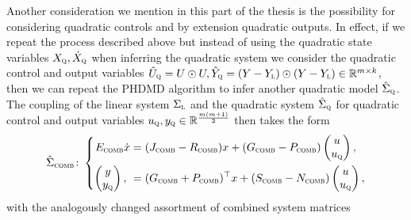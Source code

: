 
Another consideration we mention in this part of the thesis is the possibility for considering quadratic controls and by extension quadratic outputs.
In effect, if we repeat the process described above but instead of using the quadratic state variables $X_{\textnormal{\scshape q}}, \dot{X}_{\textnormal{\scshape q}}$ when inferring the quadratic system we consider the quadratic control and output variables $\hat{U}_{\textnormal{\scshape q}} = U \odot U, \hat{Y}_{\textnormal{\scshape q}} = (Y - Y_{\textnormal{\scshape l}}) \odot (Y - Y_{\textnormal{\scshape l}}) \in \mathbb{R}^{m \times k}$, then we can repeat the \ac{PHDMD} algorithm to infer another quadratic model $\hat{\Sigma}_{\textnormal{\scshape q}}$.
The coupling of the linear system $\Sigma_{\textnormal{\scshape l}}$ and the quadratic system $\hat{\Sigma}_{\textnormal{\scshape q}}$ for quadratic control and output variables $u_{\textnormal{\scshape q}}, y_{\textnormal{\scshape q}} \in \mathbb{R}^{\frac{m (m + 1)}{2}}$ then takes the form
\begin{equation}\label{eq:quad-io-system-coupling}
    \hat{\Sigma}_{\textnormal{\scshape comb}} \colon \left\lbrace
    \begin{aligned}
        E_{\textnormal{\scshape comb}} \dot{x} &= (J_{\textnormal{\scshape comb}} - R_{\textnormal{\scshape comb}}) x + (G_{\textnormal{\scshape comb}} - P_{\textnormal{\scshape comb}}) \begin{pmatrix}
            u \\
            u_{\textnormal{\scshape q}}
        \end{pmatrix}, \\
        \begin{pmatrix}
            y \\
            y_{\textnormal{\scshape q}}
        \end{pmatrix}, \ &= (G_{\textnormal{\scshape comb}} + P_{\textnormal{\scshape comb}})^{\top} x + (S_{\textnormal{\scshape comb}} - N_{\textnormal{\scshape comb}}) \begin{pmatrix}
            u \\
            u_{\textnormal{\scshape q}}
        \end{pmatrix},
    \end{aligned}
    \right.
\end{equation}
with the analogously changed assortment of combined system matrices
